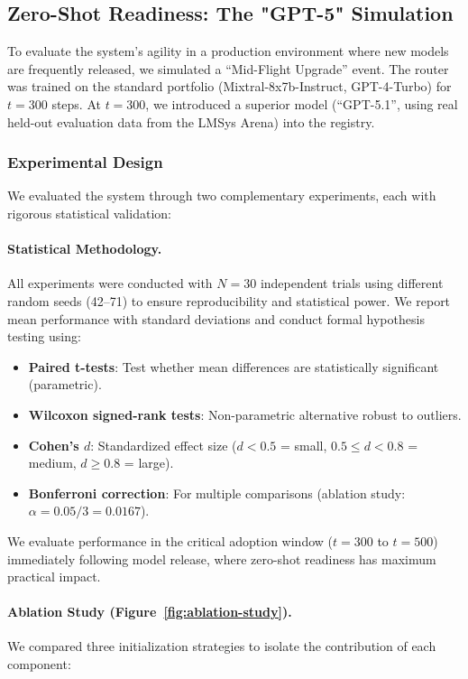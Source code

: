 
\subsection{Zero-Shot Readiness: The "GPT-5" Simulation}
\label{sec:zero-shot-readiness}

To evaluate the system's agility in a production environment where new models are frequently released, we simulated a ``Mid-Flight Upgrade'' event. The router was trained on the standard portfolio (Mixtral-8x7b-Instruct, GPT-4-Turbo) for $t=300$ steps. At $t=300$, we introduced a superior model (``GPT-5.1'', using real held-out evaluation data from the LMSys Arena) into the registry.

\subsubsection{Experimental Design}

We evaluated the system through two complementary experiments, each with rigorous statistical validation:

\paragraph{Statistical Methodology.}
All experiments were conducted with $N=30$ independent trials using different random seeds (42--71) to ensure reproducibility and statistical power. We report mean performance with standard deviations and conduct formal hypothesis testing using:
\begin{itemize}
    \item \textbf{Paired t-tests}: Test whether mean differences are statistically significant (parametric).
    \item \textbf{Wilcoxon signed-rank tests}: Non-parametric alternative robust to outliers.
    \item \textbf{Cohen's $d$}: Standardized effect size ($d < 0.5$ = small, $0.5 \leq d < 0.8$ = medium, $d \geq 0.8$ = large).
    \item \textbf{Bonferroni correction}: For multiple comparisons (ablation study: $\alpha = 0.05/3 = 0.0167$).
\end{itemize}
We evaluate performance in the critical adoption window ($t=300$ to $t=500$) immediately following model release, where zero-shot readiness has maximum practical impact.

\paragraph{Ablation Study (Figure~\ref{fig:ablation-study}).} 
We compared three initialization strategies to isolate the contribution of each component:


